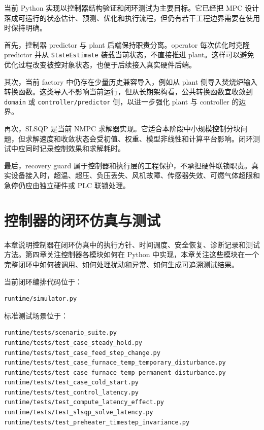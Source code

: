 \documentclass[UTF8,openany,zihao=-4,oneside]{ctexbook}
\providecommand{\passthrough}[1]{#1}
\begin{document}
当前 Python 实现以控制器结构验证和闭环测试为主要目标。它已经把 MPC 设计落成可运行的状态估计、预测、优化和执行流程，但仍有若干工程边界需要在使用时保持明确。

首先，控制器 predictor 与 plant 后端保持职责分离。operator 每次优化时克隆 predictor 并从 \passthrough{\lstinline!StateEstimate!} 装载当前状态，不直接推进 plant。这样可以避免优化过程改变被控对象状态，也便于后续接入真实硬件后端。

其次，当前 factory 中仍存在少量历史兼容导入，例如从 plant 侧导入焚烧炉输入转换函数。这类导入不影响当前运行，但从长期架构看，公共转换函数宜收敛到 \passthrough{\lstinline!domain!} 或 \passthrough{\lstinline!controller/predictor!} 侧，以进一步强化 plant 与 controller 的边界。

再次，SLSQP 是当前 NMPC 求解器实现。它适合本阶段中小规模控制分块问题，但求解速度和收敛状态会受初值、权重、模型非线性和计算平台影响。闭环测试中应同时记录控制效果和求解耗时。

最后，recovery guard 属于控制器和执行层的工程保护，不承担硬件联锁职责。真实设备接入时，超温、超压、负压丢失、风机故障、传感器失效、可燃气体超限和急停仍应由独立硬件或 PLC 联锁处理。

\chapter{控制器的闭环仿真与测试}\label{chap:closed-loop-policy-test}

本章说明控制器在闭环仿真中的执行方针、时间调度、安全恢复、诊断记录和测试方法。第四章关注控制器各模块如何在 Python 中实现，本章关注这些模块在一个完整闭环中如何被调用、如何处理扰动和异常、如何生成可追溯测试结果。

当前闭环编排代码位于：

\begin{lstlisting}
runtime/simulator.py
\end{lstlisting}

标准测试场景位于：

\begin{lstlisting}
runtime/tests/scenario_suite.py
runtime/tests/test_case_steady_hold.py
runtime/tests/test_case_feed_step_change.py
runtime/tests/test_case_furnace_temp_temporary_disturbance.py
runtime/tests/test_case_furnace_temp_permanent_disturbance.py
runtime/tests/test_case_cold_start.py
runtime/tests/test_control_latency.py
runtime/tests/test_compute_latency_effect.py
runtime/tests/test_slsqp_solve_latency.py
runtime/tests/test_preheater_timestep_invariance.py
\end{lstlisting}
\end{document}
